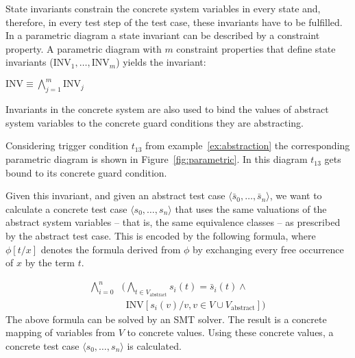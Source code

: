 State invariants constrain the concrete system variables in every state and, therefore, in every test step of the test case, these
invariants have to be fulfilled. In a parametric diagram
a state invariant can be described by a constraint property. A parametric
diagram with $m$ constraint properties that define state invariants
($\text{INV}_1,\ldots,\text{INV}_m$) yields the invariant:

$\text{INV} \equiv \bigwedge_{j=1}^{m} \text{INV}_j$

Invariants in the concrete system are also used 
to bind the values of abstract system variables to
the concrete guard conditions they are abstracting.
\begin{example}
Considering trigger condition $t_{13}$ from example~\ref{ex:abstraction} the corresponding parametric diagram is shown in Figure~\ref{fig:parametric}. In this diagram $t_{13}$ gets bound to its concrete guard condition. 
\end{example}
Given this invariant, and given an abstract test case
\mbox{$\langle\bar{s}_0,\ldots,\bar{s}_n\rangle$}, we want to calculate a concrete test case
\mbox{$\langle s_0,\ldots,s_n\rangle$} that uses the same valuations of the abstract 
system variables -- that is, the same equivalence classes -- as prescribed by the
abstract test case. This is encoded by the following formula, where
%
%
%
$\phi[t/x]$ denotes  the formula derived from $\phi$ by exchanging every free occurrence of $x$ by the term $t$.


\begin{align}
\bigwedge_{i=0}^{n}& \big(\bigwedge_{t\in V_\text{abstract}} s_i(t) =\bar{s}_i(t) \wedge {}\\
& 
\ \ \text{INV}[s_i(v)/v, v\in V\cup V_\text{abstract}]\big)
\end{align}
The above formula can be solved by an SMT solver.
The result is a concrete mapping of variables from $V$ to concrete values.
Using these concrete values, a concrete test case $\langle s_0,\ldots,s_n\rangle$ is
calculated.
% 

